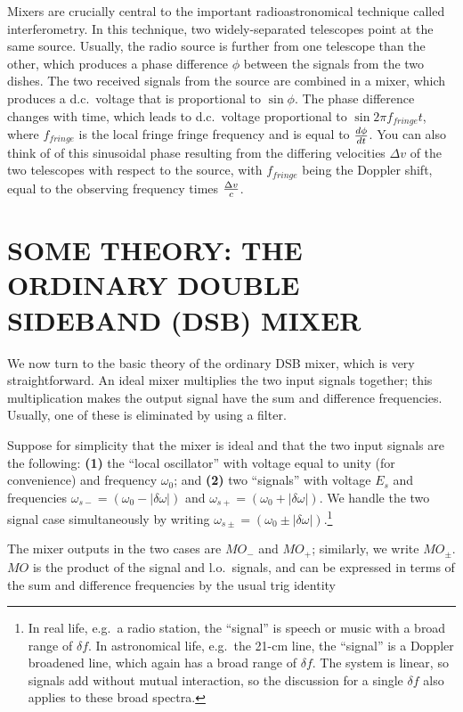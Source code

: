 \documentclass[11pt,preprint]{aastex}
\begin{document}
        Mixers are crucially central to the important radioastronomical
technique called interferometry.  In this technique, two
widely-separated telescopes point at the same source.  Usually, the
radio source is further from one telescope than the other, which
produces a phase difference $\phi$ between the signals from the two
dishes.  The two received signals from the source are combined in a
mixer, which produces a d.c.\ voltage that is proportional to $\sin
\phi$. The phase difference changes with time, which leads to d.c.\
voltage proportional to $\sin 2\pi f_{fringe}t$, where $f_{fringe}$ is
the local fringe fringe frequency and is equal to $d\phi \over dt$.  You
can also think of of this sinusoidal phase resulting from the differing
velocities $\Delta v$ of the two telescopes with respect to the source,
with $f_{fringe}$ being the Doppler shift, equal to the observing
frequency times $\Delta v \over c$.

\section { SOME THEORY: THE ORDINARY DOUBLE SIDEBAND (DSB) MIXER}

        We now turn to the basic theory of the ordinary DSB mixer, which
is very straightforward.  An ideal mixer multiplies the two input
signals together; this multiplication makes the output signal have the
sum and difference frequencies.  Usually, one of these is eliminated by
using a filter.

        Suppose for simplicity that the mixer is ideal and that the two
input signals are the following: {\bf (1)} the ``local oscillator'' with
voltage equal to unity (for convenience) and frequency $\omega_0$; and
{\bf (2)} two ``signals'' with voltage $E_s$ and frequencies
$\omega_{s-} = (\omega_0 - |\delta \omega |)$ and $\omega_{s+} =
(\omega_0 + |\delta \omega |)$. We handle the two signal case
simultaneously by writing $\omega_{s \pm} = (\omega_0 \pm |\delta \omega
|)$.\footnote{In real life, e.g.\ a radio station, the ``signal'' is
speech or music with a broad range of $\delta f$. In astronomical life,
e.g.\ the 21-cm line, the ``signal'' is a Doppler broadened line, which
again has a broad range of $\delta f$. The system is linear, so signals
add without mutual interaction, so the discussion for a single $\delta
f$ also applies to these broad spectra.}

        The mixer outputs in the two cases are $MO_-$ and $MO_+$;
similarly, we write $MO_{\pm}$. $MO$ is the product of the signal and
l.o.~signals, and can be expressed in terms of the sum and difference
frequencies by the usual trig identity
\end{document}
